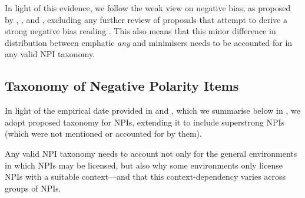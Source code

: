 In light of this evidence, we follow the weak view on negative bias, as proposed by \textcite{Borkin1971}, \textcite{vanRooij2003}, and \textcite{Jeong2021,Jeong2022}, excluding any further review of proposals that attempt to derive a strong negative bias reading \parencite[e.g.][]{Guerzoni2003,Guerzoni2004,Asher2005}. This also means that this minor difference in distribution between emphatic \textit{any} and minimisers needs to be accounted for in any valid NPI taxonomy.

\subsection{Taxonomy of Negative Polarity Items}
In light of the empirical date provided in  and , which we summarise below in , we adopt  proposed taxonomy for NPIs, extending it to include superstrong NPIs (which were not mentioned or accounted for by them). 
\begin{table}[!htb]
\end{table}

\noindent Any valid NPI taxonomy needs to account not only for the general environments in which NPIs may be licensed, but also why some environments only license NPIs with a suitable context---and that this context-dependency varies across groups of NPIs.

